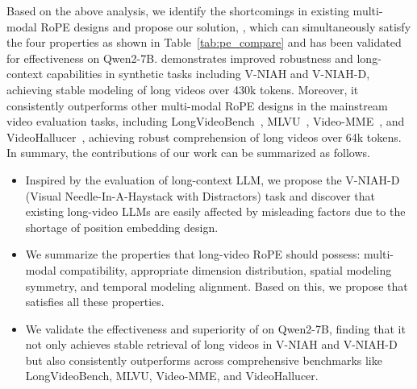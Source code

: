 Based on the above analysis, we identify the shortcomings in existing multi-modal RoPE designs and propose our solution, \methodname, which can simultaneously satisfy the four properties as shown in Table~\ref{tab:pe_compare} and has been validated for effectiveness on Qwen2-7B\citep{wang2024qwen2}. \methodname demonstrates improved robustness and long-context capabilities in synthetic tasks including V-NIAH and V-NIAH-D, achieving stable modeling of long videos over 430k tokens. Moreover, it consistently outperforms other multi-modal RoPE designs in the mainstream video evaluation tasks, including LongVideoBench~\cite{wu2024longvideobench}, MLVU~\cite{zhou2024mlvu}, Video-MME~\cite{fu2024video}, and VideoHallucer~\cite{videohallucer}, achieving robust comprehension of long videos over 64k tokens. In summary, the contributions of our work can be summarized as follows.
\begin{itemize}
\item Inspired by the evaluation of long-context LLM, we propose the V-NIAH-D (Visual Needle-In-A-Haystack with Distractors) task and discover that existing long-video LLMs are easily affected by misleading factors due to the shortage of position embedding design.
\item We summarize the properties that long-video RoPE should possess: multi-modal compatibility, appropriate dimension distribution, spatial modeling symmetry, and temporal modeling alignment. Based on this, we propose \methodname that satisfies all these properties.
\item We validate the effectiveness and superiority of \methodname on Qwen2-7B, finding that it not only achieves stable retrieval of long videos in V-NIAH and V-NIAH-D but also consistently outperforms across comprehensive benchmarks like LongVideoBench, MLVU, Video-MME, and VideoHallucer.
\end{itemize}
